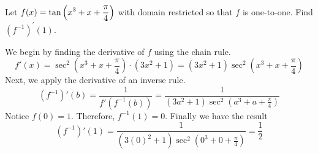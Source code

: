 \begin{example} \label{Ex:2.8.Eg2}
Let $\displaystyle f(x)=\tan \left( x^3+x+\frac{\pi}{4} \right)$ with domain restricted %
so that $f$ is one-to-one. Find $(f^{-1})^\prime(1)$.

\solution We begin by finding the derivative of $f$ using the chain rule.
$$ f'(x) = \sec^2 \left( x^3+x+\frac{\pi}{4} \right) \cdot (3x^2+1) = (3x^2+1) \sec^2 \left( x^3+x+\frac{\pi}{4} \right)$$ 
Next, we apply the derivative of an inverse rule.
$$ (f^{-1})'(b) = \dfrac{1}{f'(f^{-1}(b))} = \dfrac{1}{(3a^2+1) \sec^2 \left( a^3+a+\frac{\pi}{4} \right)} $$
Notice $f(0)=1$. Therefore, $f^{-1}(1)=0$. Finally we have the result
$$ (f^{-1})'(1) = \dfrac{1}{(3(0)^2+1) \sec^2 \left( 0^3+0+\frac{\pi}{4} \right)} = \dfrac{1}{2} $$
\end{example}